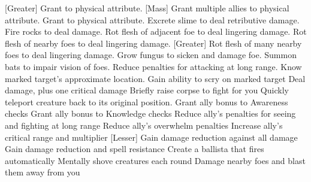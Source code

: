 [Greater]
    {Grant  to physical attribute.}
[Mass]
    {Grant multiple allies  to physical attribute.}
    {Grant  to physical attribute.}
    {Excrete slime to deal retributive damage.}
    {Fire rocks to deal damage.}
    {Rot flesh of adjacent foe to deal lingering damage.}
    {Rot flesh of nearby foes to deal lingering damage.}
[Greater]
    {Rot flesh of many nearby foes to deal lingering damage.}
    {Grow fungus to sicken and damage foe.}
    {Summon bats to impair vision of foes.}
    {Reduce penalties for attacking at long range.}
    {Know marked target's approximate location.}
    {Gain ability to scry on marked target}
    {Deal damage, plus one critical damage}
    {Briefly raise corpse to fight for you}
    {Quickly teleport creature back to its original position.}
    {Grant ally bonus to Awareness checks}
    {Grant ally bonus to Knowledge checks}
    {Reduce ally's penalties for seeing and fighting at long range}
    {Reduce ally's overwhelm penalties}
    {Increase ally's critical range and multiplier}
[Lesser]
    {Gain damage reduction against all damage}
    {Gain damage reduction and spell resistance}
    {Create a ballista that fires automatically}
    {Mentally shove creatures each round}
    {Damage nearby foes and blast them away from you}
